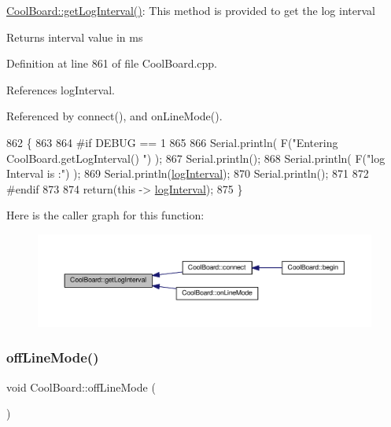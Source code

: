 \hyperlink{classCoolBoard_aaa24480b273fc095a1356a589c333781}{Cool\+Board\+::get\+Log\+Interval()}\+: This method is provided to get the log interval

\begin{DoxyReturn}{Returns}
interval value in ms 
\end{DoxyReturn}


Definition at line 861 of file Cool\+Board.\+cpp.



References log\+Interval.



Referenced by connect(), and on\+Line\+Mode().


\begin{DoxyCode}
862 \{
863 
864 \textcolor{preprocessor}{#if DEBUG == 1}
865 
866     Serial.println( F(\textcolor{stringliteral}{"Entering CoolBoard.getLogInterval() "}) );
867     Serial.println();
868     Serial.println( F(\textcolor{stringliteral}{"log Interval is :"}) );
869     Serial.println(\hyperlink{classCoolBoard_a84bc94413b64973e4aba8c467c97006c}{logInterval});
870     Serial.println();
871 
872 \textcolor{preprocessor}{#endif}
873 
874     \textcolor{keywordflow}{return}(\textcolor{keyword}{this} -> \hyperlink{classCoolBoard_a84bc94413b64973e4aba8c467c97006c}{logInterval});
875 \}
\end{DoxyCode}
Here is the caller graph for this function\+:\nopagebreak
\begin{figure}[H]
\begin{center}
\leavevmode
\includegraphics[width=350pt]{classCoolBoard_aaa24480b273fc095a1356a589c333781_icgraph}
\end{center}
\end{figure}
\mbox{\label{classCoolBoard_ae6b5e1274d760462290192acea4adca8}} 
\subsubsection{\texorpdfstring{off\+Line\+Mode()}{offLineMode()}}
{\footnotesize\ttfamily void Cool\+Board\+::off\+Line\+Mode (\begin{DoxyParamCaption}{ }\end{DoxyParamCaption})}

